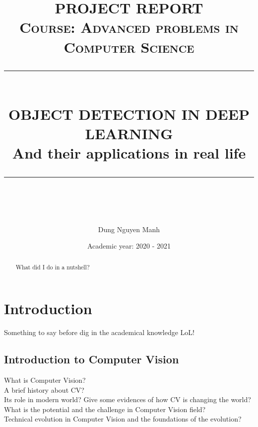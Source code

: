 \documentclass[12pt]{report}
\newcommand{\HRule}[1]{\rule{\linewidth}{#1}}
\begin{document}
\title{ \normalsize \textsc{PROJECT REPORT\\
Course: Advanced problems in Computer Science}
		\\ [5.0cm]
		\HRule{0.5pt} \\
		\LARGE \textbf{\uppercase{OBJECT DETECTION IN DEEP LEARNING}} 
		\\ [0.25 cm]
		\large {And their applications in real life}
		\HRule{2pt} \\ [0.5 cm]
		\normalsize  \vspace*{5\baselineskip}}

\date{ 
    \large{Academic year: 2020 - 2021}
}

\author{
        Dung Nguyen Manh \\
    }

\newpage
\maketitle

\sectionfont{\scshape}

\tableofcontents
\newpage


\begin{abstract}
What did I do in a nutshell?     
\end{abstract}


\chapter{Introduction}
Something to say before dig in the academical knowledge LoL!

\newpage

\section{Introduction to Computer Vision}
What is Computer Vision? \\
A brief history about CV? \\
Its role in modern world? Give some evidences of how CV is changing the world? \\
What is the potential and the challenge in Computer Vision field? \\
Technical evolution in Computer Vision and the foundations of the evolution? 
\end{document}
